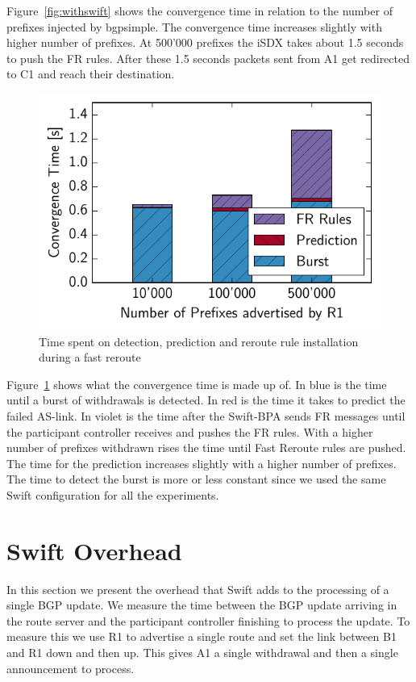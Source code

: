 Figure~\ref{fig:withswift} shows the convergence time in relation to the number of prefixes injected by bgpsimple.
The convergence time increases slightly with higher number of prefixes. At 500'000 prefixes the iSDX takes about 1.5 seconds to push the FR rules. After these 1.5 seconds packets sent from A1 get redirected to C1 and reach their destination. 

\begin{figure}[h]
\center
\includegraphics[scale = 1]{Figures/barplot.pdf}
\caption{Time spent on detection, prediction and reroute rule installation during a fast reroute}
\label{fig:activities}
\end{figure}

Figure~\ref{fig:activities} shows what the convergence time is made up of. In blue is the time until a burst of withdrawals is detected. In red is the time it takes to predict the failed AS-link. In violet is the time after the Swift-BPA sends FR messages until the participant controller receives and pushes the FR rules. With a higher number of prefixes withdrawn rises the time until Fast Reroute rules are pushed. The time for the prediction increases slightly with a higher number of prefixes. The time to detect the burst is more or less constant since we used the same Swift configuration for all the experiments. 

\section{\label{chapter5:Swift overhead}Swift Overhead}

In this section we present the overhead that Swift adds to the processing of a single BGP update. We measure the time between the BGP update arriving in the route server and the participant controller finishing to process the update. To measure this we use R1 to advertise a single route and set the link between B1 and R1 down and then up. This gives A1 a single withdrawal and then a single announcement to process. 

